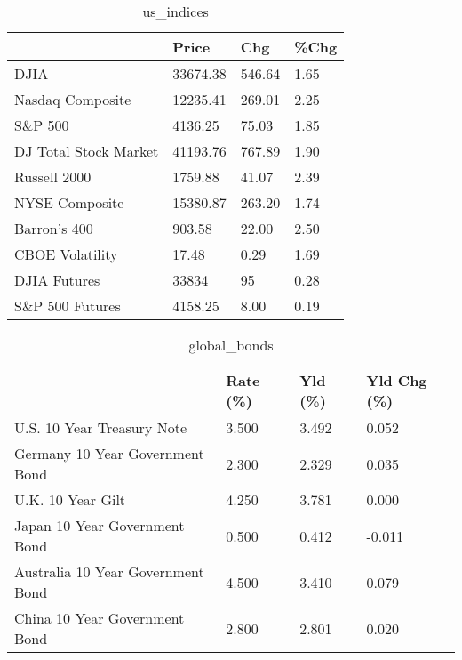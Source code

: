 \documentclass{article}%
\begin{document}
%


\begin{table}[htbp]%
\caption{us\_indices}%
\centering%
\begin{adjustbox}{width=1\textwidth}%
\begin{tabular}{llll}
\toprule
                      &    Price &    Chg & \%Chg \\
\midrule
                 DJIA & 33674.38 & 546.64 & 1.65 \\
     Nasdaq Composite & 12235.41 & 269.01 & 2.25 \\
              S\&P 500 &  4136.25 &  75.03 & 1.85 \\
DJ Total Stock Market & 41193.76 & 767.89 & 1.90 \\
         Russell 2000 &  1759.88 &  41.07 & 2.39 \\
       NYSE Composite & 15380.87 & 263.20 & 1.74 \\
         Barron's 400 &   903.58 &  22.00 & 2.50 \\
      CBOE Volatility &    17.48 &   0.29 & 1.69 \\
         DJIA Futures &    33834 &     95 & 0.28 \\
      S\&P 500 Futures &  4158.25 &   8.00 & 0.19 \\
\bottomrule
\end{tabular}
%
\end{adjustbox}%
\end{table}

%


\begin{table}[htbp]%
\caption{global\_bonds}%
\centering%
\begin{adjustbox}{width=1\textwidth}%
\begin{tabular}{llll}
\toprule
                                  & Rate (\%) & Yld (\%) & Yld Chg (\%) \\
\midrule
       U.S. 10 Year Treasury Note &    3.500 &   3.492 &       0.052 \\
  Germany 10 Year Government Bond &    2.300 &   2.329 &       0.035 \\
                U.K. 10 Year Gilt &    4.250 &   3.781 &       0.000 \\
    Japan 10 Year Government Bond &    0.500 &   0.412 &      -0.011 \\
Australia 10 Year Government Bond &    4.500 &   3.410 &       0.079 \\
    China 10 Year Government Bond &    2.800 &   2.801 &       0.020 \\
\bottomrule
\end{tabular}
%
\end{adjustbox}%
\end{table}
\end{document}
